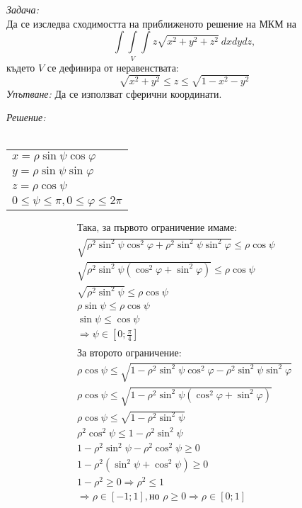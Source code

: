 \documentclass[fleqn,12pt]{article}
\date{25 април 2017}
\begin{document}
\textit{Задача:} \\
Да се изследва сходимостта на приближеното решение на МКМ на
\[
\int \int\limits_V \int z \sqrt{x^2 + y^2 + z^2}\ dxdydz,
\]
където $V$ се дефинира от неравенствата:
\[
\sqrt{x^2 + y^2} \leq z \leq \sqrt{1 - x^2 - y^2}
\]
\textit{Упътване:} Да се използват сферични координати.\\
\par
\textit{Решение:} \\
\\
\begin{tabular}{|l}
$x = \rho \sin \psi \cos \varphi$ \\
$y = \rho \sin \psi \sin \varphi$ \\
$z = \rho \cos \psi$ \\
$0 \leq \psi \leq \pi, 0 \leq \varphi \leq 2\pi$
\end{tabular}

\begin{multline}
\text{Така, за първото ограничение имаме:}\\
\sqrt{\rho^2 \sin^2 \psi \cos^2 \varphi + \rho^2 \sin^2 \psi \sin^2 \varphi} \leq \rho \cos \psi\\
\sqrt{\rho^2 \sin^2 \psi (\cos^2 \varphi + \sin^2 \varphi)} \leq \rho \cos \psi\\
\sqrt{\rho^2 \sin^2 \psi} \leq \rho \cos\psi\\
\rho \sin \psi \leq \rho \cos \psi\\
\sin \psi \leq \cos \psi\\
\Rightarrow \psi \in [0;\frac{\pi}{4}]\\
\\
\text{За второто ограничение:}\\
\rho \cos \psi \leq \sqrt{1 - \rho^2 \sin^2 \psi \cos^2 \varphi - \rho^2 \sin^2 \psi \sin^2 \varphi}\\
\rho \cos \psi \leq \sqrt{1 - \rho^2 \sin^2 \psi(\cos^2 \varphi + \sin^2 \varphi)}\\
\rho \cos \psi \leq \sqrt{1 - \rho^2 \sin^2 \psi}\\
\rho^2 \cos^2\psi \leq 1 - \rho^2 \sin^2 \psi\\
1 - \rho^2 \sin^2 \psi - \rho^2 \cos^2 \psi \geq 0\\
1 - \rho^2 (\sin^2 \psi + \cos^2 \psi) \geq 0\\
1 - \rho^2 \geq 0 \Rightarrow \rho^2 \leq 1 \\
\Rightarrow \rho \in [-1;1], \text{но } \rho \geq 0 \Rightarrow \rho \in [0;1]\\
\\
\end{multline}
\end{document}
